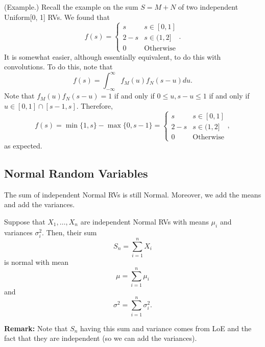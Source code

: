 \documentclass[letterpaper]{article}
\begin{document}
\begin{mdframed}[]
    (Example.) Recall the example on the sum $S = M + N$ of two independent Uniform[0, 1] RVs. We found that 
    \[f(s) = \begin{cases}
        s & s \in [0, 1] \\ 
        2 - s & s \in (1, 2] \\ 
        0 & \text{Otherwise}
    \end{cases}.\]
    It is somewhat easier, although essentially equivalent, to do this with convolutions. To do this, note that 
    \[f(s) = \int_{-\infty}^{\infty} f_{M}(u) f_{N}(s - u) du.\]
    Note that $f_{M}(u) f_{N}(s - u) = 1$ if and only if $0 \leq u, s - u \leq 1$ if and only if $u \in [0, 1] \cap [s - 1, s]$. Therefore,
    \[f(s) = \min\{1, s\} - \max\{0, s - 1\} = \begin{cases}
        s & s \in [0, 1] \\ 
        2 - s & s \in (1, 2] \\ 
        0 & \text{Otherwise}
    \end{cases},\] 
    as expected.
\end{mdframed}

\subsection{Normal Random Variables}
The sum of independent Normal RVs is still Normal. Moreover, we add the means and add the variances. 

\begin{theorem}{}{}
    Suppose that $X_1, \dots, X_n$ are independent Normal RVs with means $\mu_i$ and variances $\sigma_i^2$. Then, their sum 
    \[S_n = \sum_{i = 1}^{n} X_i\]
    is normal with mean 
    \[\mu = \sum_{i = 1}^{n} \mu_i\]
    and 
    \[\sigma^2 = \sum_{i = 1}^{n} \sigma_{i}^2.\]
\end{theorem}
\textbf{Remark:} Note that $S_n$ having this sum and variance comes from LoE and the fact that they are independent (so we can add the variances). 

\end{document}
